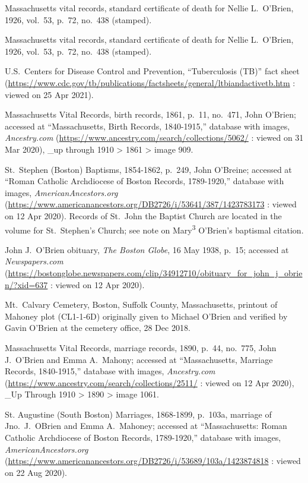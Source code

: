 \begin{thebibliography}{999}
Massachusetts vital records, standard certificate of death for Nellie L.\ O'Brien, 1926, vol.\ 53, p.\ 72, no.\ 438 (stamped).

Massachusetts vital records, standard certificate of death for Nellie L.\ O'Brien, 1926, vol.\ 53, p.\ 72, no.\ 438 (stamped).

U.S.\ Centers for Disease Control and Prevention, ``Tuberculosis (TB)'' fact sheet (\url{https://www.cdc.gov/tb/publications/factsheets/general/ltbiandactivetb.htm} : viewed on 25 Apr 2021).


Massachusetts Vital Records, birth records, 1861, p.\ 11, no.\ 471, John O'Brien; accessed at ``Massachusetts, Birth Records, 1840-1915,'' database with images, \textit{Ancestry.com} (\url{https://www.ancestry.com/search/collections/5062/} : viewed on 31 Mar 2020), \_up through 1910 > 1861 > image 909.

St.\ Stephen (Boston) Baptisms, 1854-1862, p.\ 249, John O'Breine; accessed at ``Roman Catholic Archdiocese of Boston Records, 1789-1920,'' database with images, \textit{AmericanAncestors.org} (\url{https://www.americanancestors.org/DB2726/i/53641/387/1423783173} : viewed on 12 Apr 2020). Records of St.\ John the Baptist Church are located in the volume for St.\ Stephen's Church; see note on Mary\textsuperscript{3} O'Brien's baptismal citation.

John J.\ O'Brien obituary, \textit{The Boston Globe}, 16 May 1938, p.\ 15; accessed at \textit{Newspapers.com} (\url{https://bostonglobe.newspapers.com/clip/34912710/obituary_for_john_j_obrien/?xid=637} : viewed on 12 Apr 2020).

Mt.\ Calvary Cemetery, Boston, Suffolk County, Massachusetts, printout of Mahoney plot (CL1-1-6D) originally given to Michael O'Brien and verified by Gavin O'Brien at the cemetery office, 28 Dec 2018.

Massachusetts Vital Records, marriage records, 1890, p.\ 44, no.\ 775, John J.\ O'Brien and Emma A.\ Mahony; accessed at ``Massachusetts, Marriage Records, 1840-1915,'' database with images, \textit{Ancestry.com} (\url{https://www.ancestry.com/search/collections/2511/} : viewed on 12 Apr 2020), \_Up Through 1910 > 1890 > image 1061.

St. Augustine (South Boston) Marriages, 1868-1899, p.\ 103a, marriage of Jno.\ J.\ OBrien and Emma A.\ Mahoney; accessed at ``Massachusetts: Roman Catholic Archdiocese of Boston Records, 1789-1920,'' database with images, \textit{AmericanAncestors.org} (\url{https://www.americanancestors.org/DB2726/i/53689/103a/1423874818} : viewed on 22 Aug 2020).


\end{thebibliography}

